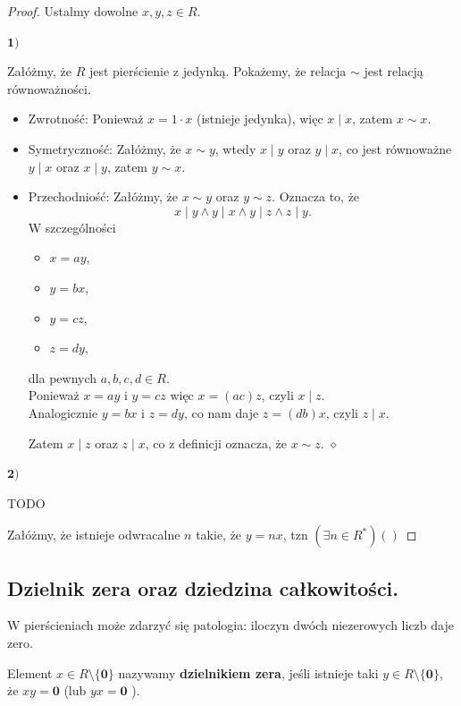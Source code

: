 \begin{proof}
	
	Ustalmy dowolne $x,y,z \in R$.

	\noindent $\bm{ 1) } $ 

	Załóżmy, że $R$ jest pierścienie z jedynką. Pokażemy, że relacja  $\sim$ jest relacją równoważności.
	\begin{itemize}
		\item Zwrotność: Ponieważ $x = 1\cdot x$ (istnieje jedynka), więc $x \mid x$, zatem $x \sim x$.
		\item Symetryczność: Załóżmy, że $x \sim y $, wtedy $x \mid y$ oraz $y \mid x$, co jest równoważne $y \mid x$ oraz $x \mid y$, zatem $y \sim x$.
		\item Przechodniość: Załóżmy, że $x\sim y $ oraz $y \sim z$. Oznacza to, że 
			\[
			x \mid y \land y \mid x \land y \mid z \land z \mid y
			.\] 
		W szczególności
		\begin{itemize}
			\item $x = ay$,
			\item $y = bx$,
			\item $y = cz$,
			\item $z = dy$,
		\end{itemize}
		dla pewnych $a,b,c,d \in R$. \\
		Ponieważ $x = ay$ i  $y = cz$ więc  $x = \left( ac \right) z$, czyli $x \mid z$.\\
		Analogicznie $y = bx$ i  $z = dy$, co nam daje  $z = \left( db \right) x$, czyli $z \mid x$.

		Zatem $x \mid z$ oraz $z \mid x$, co z definicji oznacza, że $x\sim z $. $\diamond $
	\end{itemize}

	\noindent $\bm{ 2) } $

	TODO

	Załóżmy, że istnieje odwracalne $n$ takie, że $y = nx$, tzn  $\left(\exists n \in R^{\ast}  \right) \left(  \right)  $


\end{proof} 
\subsection*{Dzielnik zera oraz dziedzina całkowitości.}

W pierścieniach może zdarzyć się patologia: iloczyn dwóch niezerowych liczb daje zero.

\begin{definition}
    Element $x \in R \setminus \{\mathbf{0}\}$ nazywamy \textbf{dzielnikiem zera}, jeśli istnieje taki $y \in R \setminus \{\mathbf{0}\}$, że $xy = \mathbf{0}$ (lub $yx = \mathbf{0} $ ).
\end{definition}

